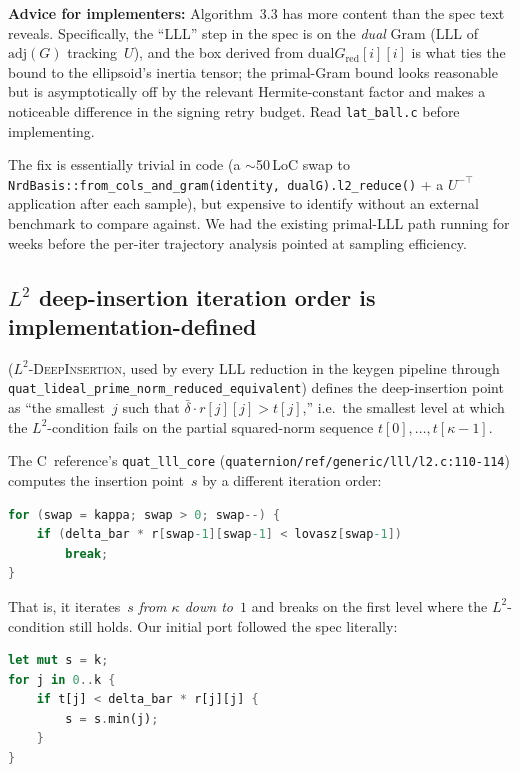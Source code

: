 \noindent\textbf{Advice for implementers:} Algorithm~3.3 has more
content than the spec text reveals.  Specifically, the
``LLL'' step in the spec is on the \emph{dual} Gram (\textsc{LLL} of
$\mathrm{adj}(G)$ tracking~$U$), and the box derived from
$\mathrm{dual}G_{\mathrm{red}}[i][i]$ is what ties the bound to the
ellipsoid's inertia tensor; the primal-Gram bound looks reasonable
but is asymptotically off by the relevant Hermite-constant factor and
makes a noticeable difference in the signing retry budget.  Read
\texttt{lat\_ball.c} before implementing.

The fix is essentially trivial in code (a $\sim$50\,LoC swap to
\texttt{NrdBasis::from\_cols\_and\_gram(identity, dualG).l2\_reduce()}
+ a $U^{-\top}$ application after each sample), but expensive to
identify without an external benchmark to compare against.  We had
the existing primal-LLL path running for weeks before the per-iter
trajectory analysis pointed at sampling efficiency.

\subsection{\texorpdfstring{$L^2$}{L2} deep-insertion iteration order
is implementation-defined}
\label{sec:bug-l2-deep-insertion-order}

 (\textsc{$L^2$-DeepInsertion}, used by every \textsc{LLL}
reduction in the keygen pipeline through
\texttt{quat\_lideal\_prime\_norm\_reduced\_equivalent}) defines the
deep-insertion point as ``the smallest~$j$ such that
$\bar\delta \cdot r[j][j] > t[j]$,'' i.e.\ the smallest level at which
the $L^2$-condition fails on the partial squared-norm sequence
$t[0], \dots, t[\kappa-1]$.

The C~reference's \texttt{quat\_lll\_core}
(\texttt{quaternion/ref/generic/lll/l2.c:110-114}) computes the
insertion point~$s$ by a different iteration order:
\begin{lstlisting}[language=C]
for (swap = kappa; swap > 0; swap--) {
    if (delta_bar * r[swap-1][swap-1] < lovasz[swap-1])
        break;
}
\end{lstlisting}
That is, it iterates~$s$ \emph{from $\kappa$ down to~$1$} and breaks
on the first level where the $L^2$-condition still holds. Our
initial port followed the spec literally:
\begin{lstlisting}[language=Rust]
let mut s = k;
for j in 0..k {
    if t[j] < delta_bar * r[j][j] {
        s = s.min(j);
    }
}
\end{lstlisting}

